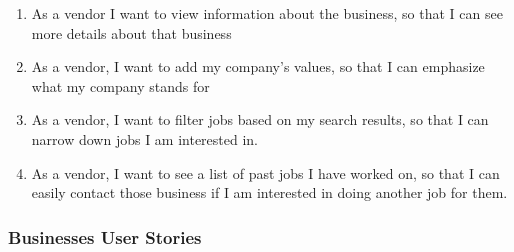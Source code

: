\documentclass[10pt]{article}
\begin{document}
\begin{enumerate}
\item As a vendor I want to view information about the business, so that I can see more details about that business
\item As a vendor, I want to add my company’s values, so that I can emphasize what my company stands for
\item As a vendor, I want to filter jobs based on my search results, so that I can narrow down jobs I am interested in.
\item As a vendor, I want to see a list of past jobs I have worked on, so that I can easily contact those business if I am interested in doing another job for them.

\end{enumerate}


\subsubsection{Businesses User Stories}
\end{document}
